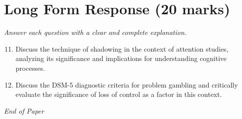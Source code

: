 \documentclass[12pt]{article}
\begin{document}
\section*{Long Form Response (20 marks)}
\textit{Answer each question with a clear and complete explanation.}
\begin{enumerate}[label=\arabic*.]
\setcounter{enumi}{10}
\item Discuss the technique of shadowing in the context of attention studies, analyzing its significance and implications for understanding cognitive processes.
\item Discuss the DSM-5 diagnostic criteria for problem gambling and critically evaluate the significance of loss of control as a factor in this context.
\end{enumerate}

\vfill
\noindent\textit{End of Paper}
\end{document}
